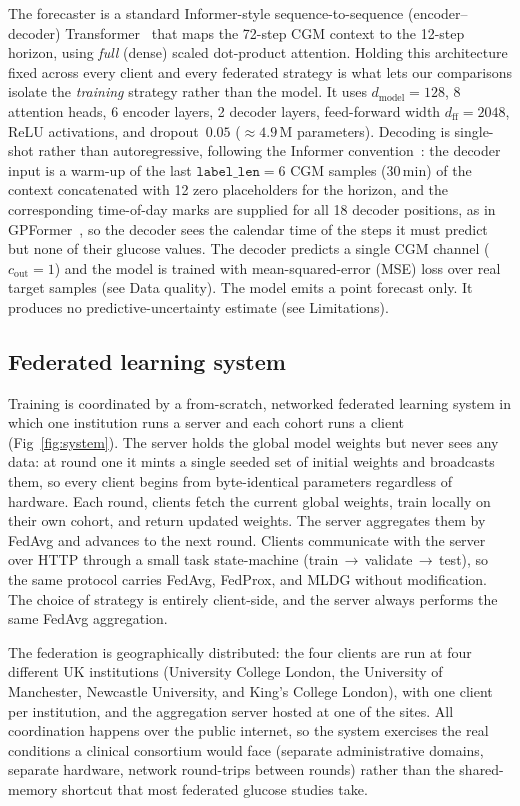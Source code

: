 \documentclass[10pt,letterpaper]{article}
\begin{document}
The forecaster is a standard Informer-style sequence-to-sequence
(encoder--decoder) Transformer~\cite{zhou2021informer} that maps
the 72-step CGM context to the 12-step horizon, using \emph{full}
(dense) scaled dot-product attention.
Holding this architecture fixed across every client and every federated
strategy is what lets our comparisons isolate the \emph{training} strategy rather
than the model. It uses
$d_{\text{model}}=128$, 8 attention heads, 6 encoder layers, 2 decoder layers,
feed-forward width $d_{\text{ff}}=2048$, ReLU activations, and dropout~$0.05$
($\approx 4.9$\,M parameters). Decoding is single-shot rather than
autoregressive, following the Informer convention~\cite{zhou2021informer}: the
decoder input is a warm-up of the last $\texttt{label\_len}=6$ CGM samples
(30\,min) of the context concatenated with 12 zero placeholders for the horizon,
and the corresponding time-of-day marks are supplied for all 18 decoder
positions, as in GPFormer~\cite{zhu2024gpformer}, so the decoder sees the
calendar time of the steps it must predict but
none of their glucose values. The decoder predicts a single CGM channel ($c_{\text{out}}=1$) and the
model is trained with mean-squared-error (MSE) loss over real target samples
(see Data quality). The model emits a point
forecast only. It produces no predictive-uncertainty estimate (see Limitations).

\subsection*{Federated learning system}

Training is coordinated by a from-scratch, networked federated learning system
in which one institution runs a server and each cohort runs a client
(Fig~\ref{fig:system}). The server
holds the global model weights but never sees any data: at round one it mints a
single seeded set of initial weights and broadcasts them, so every client begins
from byte-identical parameters regardless of hardware. Each round, clients fetch
the current global weights, train locally on their own cohort, and return updated
weights. The server aggregates them by FedAvg and advances to the next round.
Clients communicate with the server over HTTP through a small task
state-machine (train\,$\rightarrow$\,validate\,$\rightarrow$\,test), so the same
protocol carries FedAvg, FedProx, and MLDG without modification. The choice of
strategy is entirely client-side, and the server always performs the same FedAvg
aggregation.

The federation is geographically distributed: the four clients are run at four
different UK institutions (University College London, the University of
Manchester, Newcastle University, and King's College London), with one client
per institution, and the aggregation server hosted at one of the sites. All
coordination happens
over the public internet, so the system exercises the real conditions a clinical
consortium would face (separate administrative domains, separate hardware,
network round-trips between rounds) rather than the shared-memory shortcut that
most federated glucose studies take.
\end{document}

